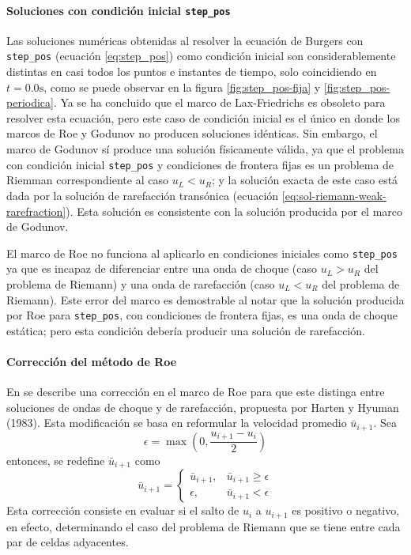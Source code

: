 \documentclass[12pt]{article}
\begin{document}
	\paragraph*{Soluciones con condición inicial \texttt{step\_pos}}
	Las soluciones numéricas obtenidas al resolver la ecuación de Burgers con \texttt{step\_pos} (ecuación \ref{eq:step_pos}) como condición inicial son considerablemente distintas en casi todos los puntos e instantes de tiempo, solo coincidiendo en $t=0.0\unit{\second}$, como se puede observar en la figura \ref{fig:step_pos-fija} y \ref{fig:step_pos-periodica}. Ya se ha concluido que el marco de Lax-Friedrichs es obsoleto para resolver esta ecuación, pero este caso de condición inicial es el único en donde los marcos de Roe y Godunov no producen soluciones idénticas. Sin embargo, el marco de Godunov sí produce una solución físicamente válida, ya que el problema con condición inicial \texttt{step\_pos} y condiciones de frontera fijas es un problema de Riemman correspondiente al caso $u_L < u_R$; y la solución exacta de este caso está dada por la solución de rarefacción transónica (ecuación \ref{eq:sol-riemann-weak-rarefraction}). Esta solución es consistente con la solución producida por el marco de Godunov.
	
	
	El marco de Roe no funciona al aplicarlo en condiciones iniciales como \texttt{step\_pos} ya que es incapaz de diferenciar entre una onda de choque (caso $u_L > u_R$ del problema de Riemann) y una onda de rarefacción (caso $u_L < u_R$ del problema de Riemann). Este error del marco es demostrable al notar que la solución producida por Roe para \texttt{step\_pos}, con condiciones de frontera fijas, es una onda de choque estática; pero esta condición debería producir una solución de rarefacción. 
	
	\paragraph*{Corrección del método de Roe}
	En \cite{pletcher1997computational} se describe una corrección en el marco de Roe para que este distinga entre soluciones de ondas de choque y de rarefacción, propuesta por Harten y Hyuman (1983). Esta modificación se basa en reformular la velocidad promedio $\bar{u}_{i+1}$. Sea 
	\begin{equation}
		\epsilon = \max\left(0, \frac{u_{i+1} - u_i}{2}\right)
	\end{equation}
	entonces, se redefine $\bar{u}_{i+1}$ como
	\begin{equation}
		\bar{u}_{i+1} = 
		\begin{cases}
			\bar{u}_{i+1}, & \bar{u}_{i+1} \geq \epsilon \\
			\epsilon, & \bar{u}_{i+1} < \epsilon
		\end{cases}
	\end{equation}
	Esta corrección consiste en evaluar si el salto de $u_i$ a $u_{i+1}$ es positivo o negativo, en efecto, determinando el caso del problema de Riemann que se tiene entre cada par de celdas adyacentes.
	
\end{document}

